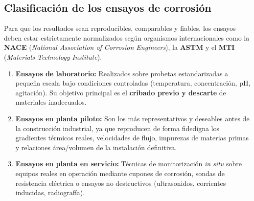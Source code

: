 \subsection{Clasificación de los ensayos de corrosión}
Para que los resultados sean reproducibles, comparables y fiables, los ensayos deben estar estrictamente normalizados según organismos internacionales como la \textbf{NACE} (\textit{National Association of Corrosion Engineers}), la \textbf{ASTM} y el \textbf{MTI} (\textit{Materials Technology Institute}).

\begin{enumerate}
    \item \textbf{Ensayos de laboratorio:} Realizados sobre probetas estandarizadas a pequeña escala bajo condiciones controladas (temperatura, concentración, pH, agitación). Su objetivo principal es el \textbf{cribado previo y descarte} de materiales inadecuados.
    \item \textbf{Ensayos en planta piloto:} Son los más representativos y deseables antes de la construcción industrial, ya que reproducen de forma fidedigna los gradientes térmicos reales, velocidades de flujo, impurezas de materias primas y relaciones área/volumen de la instalación definitiva.
    \item \textbf{Ensayos en planta en servicio:} Técnicas de monitorización \textit{in situ} sobre equipos reales en operación mediante cupones de corrosión, sondas de resistencia eléctrica o ensayos no destructivos (ultrasonidos, corrientes inducidas, radiografía).
\end{enumerate}


